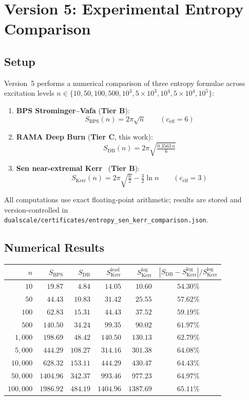 \documentclass[11pt,a4paper]{article}
\theoremstyle{plain}
\theoremstyle{definition}
\theoremstyle{remark}
\newcommand{\tierB}{\textbf{Tier B}}
\newcommand{\tierC}{\textbf{Tier C}}
\begin{document}
\section{Version 5: Experimental Entropy Comparison}\label{sec:v5}

\subsection{Setup}

Version~5 performs a numerical comparison of three entropy formulae across
excitation levels $n \in \{10, 50, 100, 500, 10^3, 5 \times 10^3, 10^4,
5 \times 10^4, 10^5\}$:

\begin{enumerate}
\item \textbf{BPS Strominger--Vafa} (\tierB{}):
\[
  S_{\mathrm{BPS}}(n) = 2\pi\sqrt{n} \qquad (c_{\mathrm{eff}} = 6)
\]
\item \textbf{RAMA Deep Burn} (\tierC{}, this work):
\[
  S_{\mathrm{DB}}(n) = 2\pi\sqrt{\tfrac{0.3563 \, n}{6}}
\]
\item \textbf{Sen near-extremal Kerr}~\cite{Sen2012} (\tierB{}):
\[
  S_{\mathrm{Kerr}}(n) = 2\pi\sqrt{\tfrac{n}{2}} - \tfrac{3}{2}\ln n
  \qquad (c_{\mathrm{eff}} = 3)
\]
\end{enumerate}

All computations use exact floating-point arithmetic; results are stored
and version-controlled in
\texttt{dualscale/certificates/entropy\_sen\_kerr\_comparison.json}.

\subsection{Numerical Results}

\begin{center}
\begin{tabular}{rrrrrc}
\toprule
$n$ & $S_{\mathrm{BPS}}$ & $S_{\mathrm{DB}}$ & $S_{\mathrm{Kerr}}^{\text{lead}}$ & $S_{\mathrm{Kerr}}^{\text{log}}$ & $|S_{\mathrm{DB}} - S_{\mathrm{Kerr}}^{\text{log}}| / S_{\mathrm{Kerr}}^{\text{log}}$ \\
\midrule
$10$        & $19.87$  & $4.84$   & $14.05$  & $10.60$  & $54.30\%$ \\
$50$        & $44.43$  & $10.83$  & $31.42$  & $25.55$  & $57.62\%$ \\
$100$       & $62.83$  & $15.31$  & $44.43$  & $37.52$  & $59.19\%$ \\
$500$       & $140.50$ & $34.24$  & $99.35$  & $90.02$  & $61.97\%$ \\
$1{,}000$   & $198.69$ & $48.42$  & $140.50$ & $130.13$ & $62.79\%$ \\
$5{,}000$   & $444.29$ & $108.27$ & $314.16$ & $301.38$ & $64.08\%$ \\
$10{,}000$  & $628.32$ & $153.11$ & $444.29$ & $430.47$ & $64.43\%$ \\
$50{,}000$  & $1404.96$ & $342.37$ & $993.46$ & $977.23$ & $64.97\%$ \\
$100{,}000$ & $1986.92$ & $484.19$ & $1404.96$ & $1387.69$ & $65.11\%$ \\
\bottomrule
\end{tabular}
\end{center}
\end{document}
